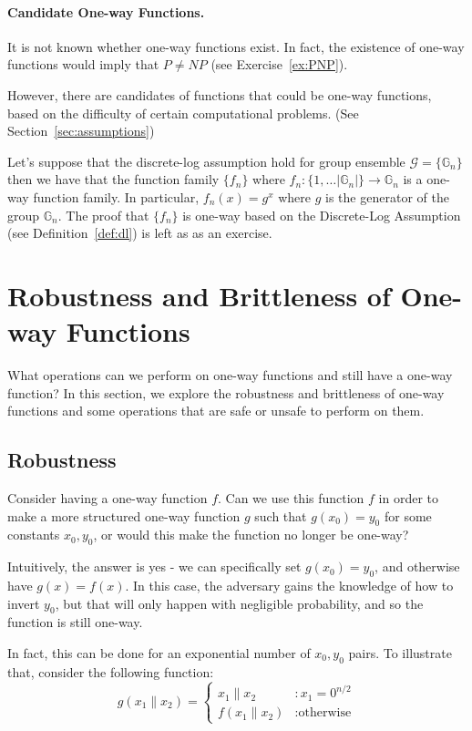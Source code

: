 \documentclass[12pt]{tufte-book}
\begin{document}
\paragraph{Candidate One-way Functions.}
It is not known whether one-way functions exist. In fact, the existence of one-way functions would imply that $P \neq NP$ (see Exercise~\ref{ex:PNP}). 

However, there are candidates of functions that could be one-way functions, based on the difficulty of certain computational problems. (See Section~\ref{sec:assumptions})



Let's suppose that the discrete-log assumption hold for group ensemble $\mathcal{G} = \{\mathbb{G}_n\}$ then we have that the function family $\{f_n\}$ where $f_n: \{1,\ldots |\mathbb{G}_n|\}\rightarrow \mathbb{G}_n$ is a one-way function family. In particular, $f_n(x) = g^x$ where $g$ is the generator of the group $\mathbb{G}_n$. The proof that $\{f_n\}$ is one-way based on the Discrete-Log Assumption (see Definition~\ref{def:dl}) is left as as an exercise. 


\section{Robustness and Brittleness of One-way Functions}
What operations can we perform on one-way functions and still have a one-way function? In this section, we explore the robustness and brittleness of one-way functions and some operations that are safe or unsafe to perform on them.

\subsection{Robustness}
Consider having a one-way function $f$.  Can we use this function $f$ in order to make a more structured one-way function $g$ such that $g(x_0) = y_0$ for some constants $x_0, y_0$, or would this make the function no longer be one-way? 

Intuitively, the answer is yes - we can specifically set $g(x_0) = y_0$, and otherwise have $g(x) = f(x)$.  In this case, the adversary gains the knowledge of how to invert $y_0$, but that will only happen with negligible probability, and so the function is still one-way.



In fact, this can be done for an exponential number of $x_0, y_0$ pairs. To illustrate that, consider the following function:
\[
  g(x_1\|x_2) = \left\{ \begin{array}{ll} x_1\|x_2 & : x_1 = 0^{n/2} \\ f(x_1\|x_2) & : \text{otherwise} \end{array} \right.
\]
\end{document}
